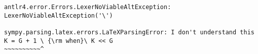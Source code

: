 \begin{verbatim}
antlr4.error.Errors.LexerNoViableAltException: LexerNoViableAltException('\')

sympy.parsing.latex.errors.LaTeXParsingError: I don't understand this
K = G + 1 \ {\rm when}\ K << G
~~~~~~~~~~^
\end{verbatim}